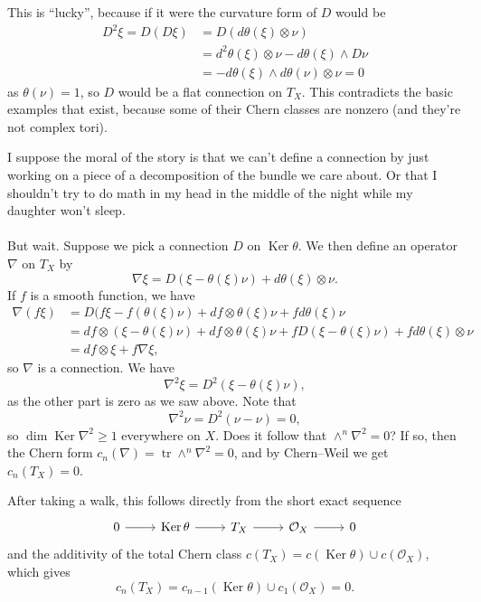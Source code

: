 \documentclass[11pt]{article}
\theoremstyle{definition}
\newcommand{\cc}[1]{\mathcal{#1}}
\DeclareMathOperator{\Ker}{Ker}
\DeclareMathOperator{\tr}{tr}
\begin{document}
This is ``lucky'', because if it were the curvature form of $D$ would be
\begin{align*}
D^2 \xi
= D(D\xi)
&= D(d \theta(\xi) \otimes \nu)
\\
&= d^2 \theta(\xi) \otimes \nu - d\theta(\xi) \wedge D\nu
\\
&= - d\theta(\xi) \wedge d\theta(\nu) \otimes \nu
= 0
\end{align*}
as $\theta(\nu) = 1$, so $D$ would be a flat connection on $T_X$. This contradicts the basic examples that exist, because some of their Chern classes are nonzero (and they're not complex tori).

I suppose the moral of the story is that we can't define a connection by just working on a piece of a decomposition of the bundle we care about. Or that I shouldn't try to do math in my head in the middle of the night while my daughter won't sleep.


\paragraph{}

But wait. Suppose we pick a connection $D$ on $\Ker \theta$. We then define an operator $\nabla$ on $T_X$ by
\[
\nabla \xi
= D(\xi - \theta(\xi) \nu) + d\theta(\xi) \otimes \nu.
\]
If $f$ is a smooth function, we have
\begin{align*}
\nabla(f \xi)
&= D(f\xi - f(\theta(\xi) \nu) + df \otimes \theta(\xi) \nu + f d\theta(\xi) \nu
\\
&= df \otimes (\xi - \theta(\xi) \nu) + df \otimes \theta(\xi) \nu + f D(\xi - \theta(\xi) \nu) + f d\theta(\xi) \otimes \nu
\\
&=
df \otimes \xi + f \nabla \xi,
\end{align*}
so $\nabla$ is a connection. We have
\[
\nabla^2 \xi = D^2(\xi - \theta(\xi) \nu),
\]
as the other part is zero as we saw above. Note that
\[
\nabla^2 \nu = D^2(\nu - \nu) = 0,
\]
so $\dim \Ker \nabla^2 \geq 1$ everywhere on $X$. Does it follow that $\wedge^n \nabla^2 = 0$? If so, then the Chern form $c_n(\nabla) = \tr \wedge^n \nabla^2 = 0$, and by Chern--Weil we get $c_n(T_X) = 0$.

After taking a walk, this follows directly from the short exact sequence
\[
\begin{tikzcd}
0 \ar[r] &
\Ker \theta \ar[r] &
T_X \ar[r] &
\cc O_X \ar[r] &
0
\end{tikzcd}
\]
and the additivity of the total Chern class $c(T_X) = c(\Ker \theta) \cup c(\cc O_X)$, which gives
\[
c_n(T_X) = c_{n-1}(\Ker \theta) \cup c_1(\cc O_X) = 0.
\]
\end{document}
